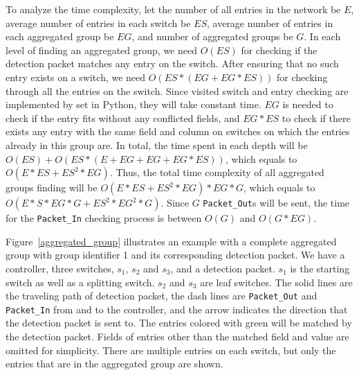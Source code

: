 \documentclass[conference]{IEEEtran}
\begin{document}
To analyze the time complexity, let the number of all entries in the network be $E$, average number of entries in each switch be $ES$, average number of entries in each aggregated group be $EG$, and number of aggregated groups be $G$. In each level of finding an aggregated group, we need $O(ES)$ for checking if the detection packet matches any entry on the switch. After ensuring that no such entry exists on a switch, we need $O(ES*(EG+EG*ES))$ for checking through all the entries on the switch. Since visited switch and entry checking are implemented by set in Python, they will take constant time. $EG$ is needed to check if the entry fits without any conflicted fields, and $EG*ES$ to check if there exists any entry with the same field and column on switches on which the entries already in this group are. In total, the time spent in each depth will be $O(ES) + O(ES* (E+EG+EG+EG*ES) )$, which equals to $O(E*ES + ES^2*EG)$. Thus, the total time complexity of all aggregated groups finding will be $O(E*ES + ES^2*EG) * EG * G$, which equals to $O(E*S*EG*G + ES^2*EG^2*G)$. Since $G$ \texttt{Packet\_Out}s will be sent, the time for the \texttt{Packet\_In} checking process is between $O(G)$ and $O(G*EG)$.

Figure~\ref{aggregated_group} illustrates an example with a complete aggregated group with group identifier 1 and its corresponding detection packet. We have a controller, three switches, $s_1$, $s_2$ and $s_3$, and a detection packet. $s_1$ is the starting switch as well as a splitting switch. $s_2$ and $s_3$ are leaf switches. The solid lines are the traveling path of detection packet, the dash lines are \texttt{Packet\_Out} and \texttt{Packet\_In} from and to the controller, and the arrow indicates the direction that the detection packet is sent to. The entries colored with green will be matched by the detection packet. Fields of entries other than the matched field and value are omitted for simplicity. There are multiple entries on each switch, but only the entries that are in the aggregated group are shown.
\end{document}
